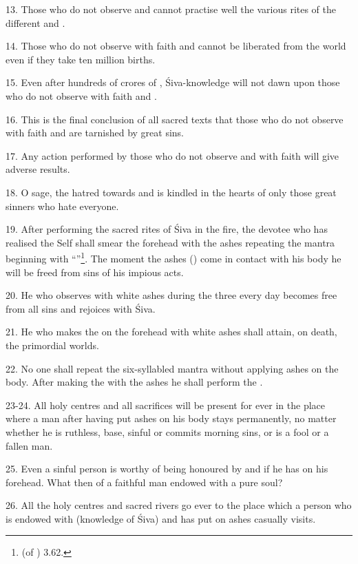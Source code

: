 13. Those who do not observe  and  cannot practise
well the various rites of the different  and .

14. Those who do not observe with faith  and  cannot
be liberated from the world even if they take ten million births.

15. Even after hundreds of crores of , Śiva-knowledge will not dawn
upon those who do not observe with faith  and .

16. This is the final conclusion of all sacred texts that those who do not
observe with faith  and  are tarnished by great sins.

17. Any action performed by those who do not observe  and
 with faith will give adverse results.

18. O sage, the hatred towards  and  is kindled in
the hearts of only those great sinners who hate everyone.

19. After performing the sacred rites of Śiva in the fire, the devotee who has
realised the Self shall smear the forehead with the ashes repeating the mantra
beginning with “”\footnote{ (of
) 3.62.}. The moment the ashes () come in contact
with his body he will be freed from sins of his impious acts.

20. He who observes  with white ashes during the three
 every day becomes free from all sins and rejoices with Śiva.

21. He who makes the  on the forehead with white ashes shall
attain, on death, the primordial worlds.

22. No one shall repeat the six-syllabled mantra without applying ashes on
the body. After making the  with the ashes he shall perform
the .

23-24. All holy centres and all sacrifices will be present for ever in the place
where a man after having put ashes on his body stays permanently, no matter
whether he is ruthless, base, sinful or commits morning sins, or is a fool or
a fallen man.

25. Even a sinful person is worthy of being honoured by  and
 if he has  on his forehead. What then of a faithful
man endowed with a pure soul?

26. All the holy centres and sacred rivers go ever to the place which a person
who is endowed with  (knowledge of Śiva) and has put on ashes
casually visits.

